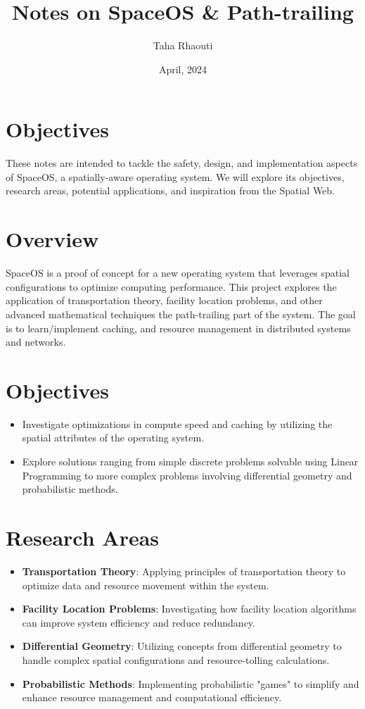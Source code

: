 \documentclass[10pt,a4paper]{article}
\title{Notes on SpaceOS \& Path-trailing}
\author{Taha Rhaouti}
\date{April, 2024}
\begin{document}
\maketitle

\begin{multicols}{2}

    \section*{Objectives}
    These notes are intended to tackle the safety, design, and implementation aspects of SpaceOS, a spatially-aware operating system. We will explore its objectives, research areas, potential applications, and inspiration from the Spatial Web.

    \section*{Overview}
    SpaceOS is a proof of concept for a new operating system that leverages spatial configurations to optimize computing performance. This project explores the application of transportation theory, facility location problems, and other advanced mathematical techniques the path-trailing part of the system. The goal is to learn/implement caching, and resource management in distributed systems and networks.

    \section*{Objectives}
    \begin{itemize}
        \item Investigate optimizations in compute speed and caching by utilizing the spatial attributes of the operating system.
        \item Explore solutions ranging from simple discrete problems solvable using Linear Programming to more complex problems involving differential geometry and probabilistic methods.
    \end{itemize}

    \section*{Research Areas}
    \begin{itemize}
        \item \textbf{Transportation Theory}: Applying principles of transportation theory to optimize data and resource movement within the system.
        \item \textbf{Facility Location Problems}: Investigating how facility location algorithms can improve system efficiency and reduce redundancy.
        \item \textbf{Differential Geometry}: Utilizing concepts from differential geometry to handle complex spatial configurations and resource-tolling calculations.
        \item \textbf{Probabilistic Methods}: Implementing probabilistic "games" to simplify and enhance resource management and computational efficiency.
    \end{itemize}


\end{multicols}
\end{document}
